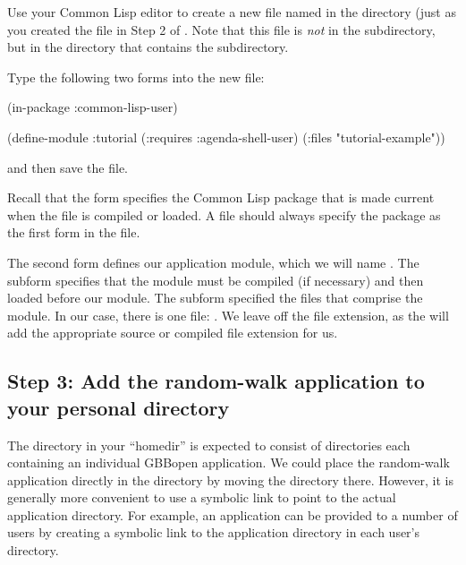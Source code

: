 \documentclass[10pt,twoside,english,pdftex]{article}
\begin{document}
Use your Common Lisp editor to create a new file named  in
the  directory (just as you created the
 file in Step 2 of .  Note that this file is \textit{not\/} in the
 subdirectory, but in the  directory that contains
the  subdirectory.

Type the following two forms into the new 
file:
%
\W\supp
\begin{example}
  (in-package :common-lisp-user)

  (define-module :tutorial
    (:requires :agenda-shell-user)
    (:files "tutorial-example"))
\end{example}
%
and then save the file.

Recall that the  form specifies the Common Lisp package that
is made current when the file is compiled or loaded.  A 
file should always specify the  package as the first
form in the file.

The second form defines our application module, which we will name
.  The  subform specifies that the
 module must be compiled (if necessary) and then
loaded before our  module.  The  subform
specified the files that comprise the module. In our case, there is one file:
.  We leave off the  file extension,
as the  will add the appropriate
source or compiled file extension for us.

\subsection*{Step 3: Add the random-walk application to your personal
   directory}

The  directory in your ``homedir'' is expected to
consist of directories each containing an individual GBBopen application.  We
could place the random-walk application directly in the 
directory by moving the  directory there.  However, it is
generally more convenient to use a symbolic link to point to the actual
application directory.  For example, an application can be provided to a
number of users by creating a symbolic link to the application directory in
each user's  directory.
\end{document}
